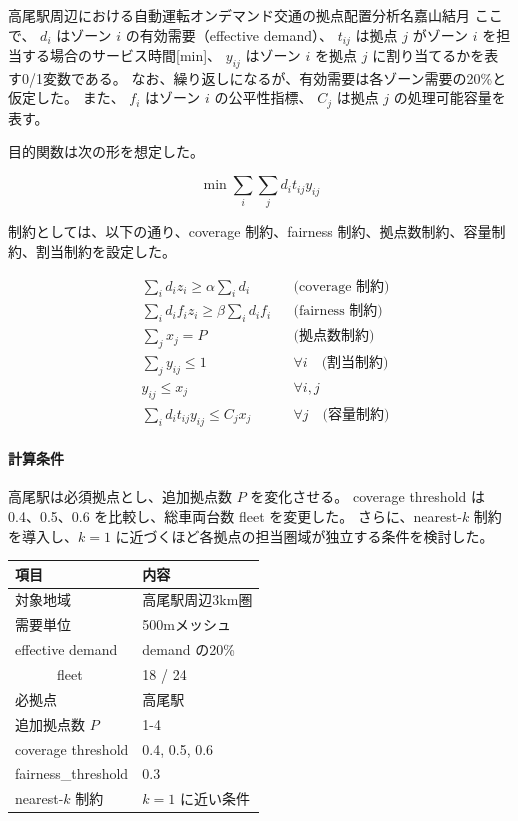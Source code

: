 \begin{column}{高尾駅周辺における自動運転オンデマンド交通の拠点配置分析}{名嘉山結月}
ここで、
$d_i$ はゾーン $i$ の有効需要（effective demand）、
$t_{ij}$ は拠点 $j$ がゾーン $i$ を担当する場合のサービス時間[min]、
$y_{ij}$ はゾーン $i$ を拠点 $j$ に割り当てるかを表す0/1変数である。
なお、繰り返しになるが、有効需要は各ゾーン需要の20\%と仮定した。
また、
$f_i$ はゾーン $i$ の公平性指標、
$C_j$ は拠点 $j$ の処理可能容量を表す。

目的関数は次の形を想定した。

\[
\min \sum_i \sum_j d_i t_{ij} y_{ij}
\]


制約としては、以下の通り、coverage 制約、fairness 制約、拠点数制約、容量制約、割当制約を設定した。

\begin{align*}
&\sum_i d_i z_i \ge \alpha \sum_i d_i
&& \text{(coverage 制約)} \\
&\sum_i d_i f_i z_i \ge \beta \sum_i d_i f_i
&& \text{(fairness 制約)} \\
&\sum_j x_j = P
&& \text{(拠点数制約)} \\
&\sum_j y_{ij} \le 1
&& \forall i \quad \text{(割当制約)} \\
&y_{ij} \le x_j
&& \forall i,j \\
&\sum_i d_i t_{ij} y_{ij}
\le
C_j x_j
&& \forall j \quad \text{(容量制約)}
\end{align*}

\paragraph{計算条件}
高尾駅は必須拠点とし、追加拠点数 $P$ を変化させる。
coverage threshold は 0.4、0.5、0.6 を比較し、総車両台数 fleet を変更した。
さらに、nearest-$k$ 制約を導入し、$k=1$ に近づくほど各拠点の担当圏域が独立する条件を検討した。

 \begin{center}
   \begin{tabular}{ll}
     \toprule
     項目 & 内容 \\
     \midrule
     対象地域 & 高尾駅周辺3km圏 \\
     需要単位 & 500mメッシュ \\
     effective demand & demand の20\% \\
　　　fleet & 18 / 24 \\ 
     必拠点 & 高尾駅 \\
     追加拠点数 $P$ & 1-4 \\
     coverage threshold & 0.4, 0.5, 0.6 \\
     fairness\_threshold & 0.3 \\ 
     nearest-$k$ 制約 & $k=1$ に近い条件 \\
     \bottomrule
   \end{tabular}
   \label{tab:parameters}
 \end{center}



\end{column}
